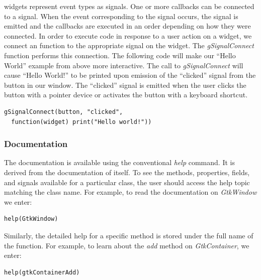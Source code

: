 \documentclass[article]{jss}
\begin{document}
 widgets represent event types as signals. One or more
callbacks can be connected to a signal. When the event corresponding to the
signal occurs, the signal is emitted and the callbacks are executed in an order
depending on how they were connected. In order to execute  code in 
response to a user action on a widget, we connect an  function to the 
appropriate signal on the widget.  The \emph{gSignalConnect} function 
performs this connection. The following code will make our ``Hello World'' 
example from above more interactive.
The call to \emph{gSignalConnect} will cause ``Hello World!'' to be printed 
upon emission of the ``clicked'' signal from the button in our window. The 
``clicked'' signal is emitted when the user clicks the button with a pointer
device or activates the button with a keyboard shortcut.
\begin{verbatim}
gSignalConnect(button, "clicked", 
  function(widget) print("Hello world!"))
\end{verbatim}

\subsubsection{Documentation}

The  documentation is available using the conventional  
\emph{help} command. It is derived from the documentation of  itself.
To see the methods, properties, fields, and signals available
for a particular class, the user should access the help topic matching the class name.
For example, to read the documentation on \emph{GtkWindow} we enter:
\begin{verbatim}
help(GtkWindow)
\end{verbatim}

Similarly, the detailed help for a specific method is stored under the full
name of the function. For example, to learn about the \emph{add} method on
\emph{GtkContainer}, we enter:
\begin{verbatim}
help(gtkContainerAdd)
\end{verbatim}
\end{document}
